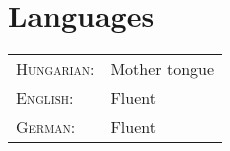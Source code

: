 \section{Languages}
\begin{tabular}{p{2cm}|l}
 \textsc{Hungarian:}&Mother tongue\\
 \textsc{English:}&Fluent\\
 \textsc{German:}&Fluent\\
\end{tabular}
\newline